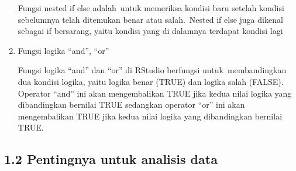 \documentclass[
]{article}
\begin{document}
\begin{enumerate}
  Fungsi nested if else adalah~untuk memeriksa kondisi baru setelah
  kondisi sebelumnya telah ditemukan benar atau salah.~Nested if else
  juga dikenal sebagai if bersarang, yaitu kondisi yang di dalamnya
  terdapat kondisi lagi
\item
  Fungsi logika ``and'', ``or''

  Fungsi logika ``and'' dan ``or'' di RStudio berfungsi
  untuk~membandingkan dua kondisi logika, yaitu logika benar (TRUE) dan
  logika salah (FALSE). Operator ``and'' ini akan mengembalikan TRUE
  jika kedua nilai logika yang dibandingkan bernilai TRUE sedangkan
  operator ``or'' ini akan mengembalikan TRUE jika kedua nilai logika
  yang dibandingkan bernilai TRUE.
\end{enumerate}

\subsection{1.2 Pentingnya untuk analisis
data}\label{pentingnya-untuk-analisis-data}
\end{document}
